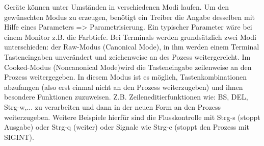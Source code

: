 \begin{answer}
Geräte können unter Umständen in verschiedenen Modi laufen. Um den gewünschten Modus zu
erzeugen, benötigt ein Treiber die Angabe desselben mit Hilfe eines Parameters => Parametrisierung.
Ein typischer Parameter wäre bei einem Monitor z.B. die Farbtiefe.
Bei Terminals werden grundsätzlich zwei Modi unterschieden: der Raw-Modus (Canonical Mode),
in ihm werden einem Terminal Tasteneingaben unverändert und zeichenweise an des Pozess
weitergereicht. Im Cooked-Modus (Noncanonical Mode)wird die Tasteneingabe zeilenweise an den
Prozess weitergegeben. In diesem Modus ist es möglich, Tastenkombinationen abzufangen (also
erst einmal nicht an den Prozess weiterzugeben) und ihnen besondere Funktionen zuzuweisen.
Z.B. Zeileneditierfunktionen wie: BS, DEL, Strg-w,... zu verarbeiten und dann in der neuen Form
an den Prozess weiterzugeben. Weitere Beispiele hierfür sind die Flusskontrolle mit Strg-s (stoppt
Ausgabe) oder Strg-q (weiter) oder Signale wie Strg-c (stoppt den Prozess mit SIGINT).
\end{answer}
